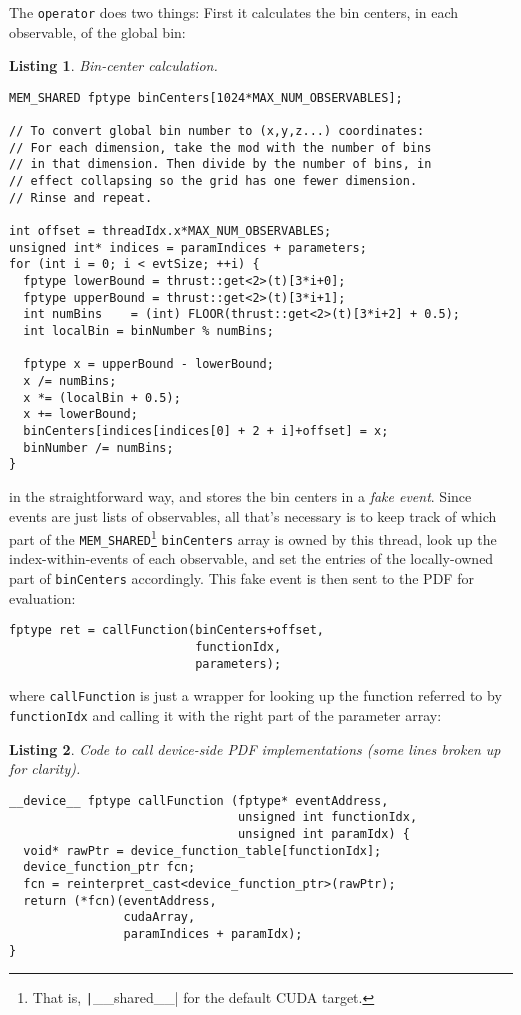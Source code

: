 \documentclass[12pt,pdflatex]{article}
\newtheorem{listing}{Listing}
\begin{document}
The \texttt{operator} does two things: First it calculates the bin centers,
in each observable, of the global bin:
\begin{listing}
\label{listing:bincenter}
Bin-center calculation.

\begin{verbatim}
MEM_SHARED fptype binCenters[1024*MAX_NUM_OBSERVABLES];

// To convert global bin number to (x,y,z...) coordinates: 
// For each dimension, take the mod with the number of bins 
// in that dimension. Then divide by the number of bins, in 
// effect collapsing so the grid has one fewer dimension. 
// Rinse and repeat. 

int offset = threadIdx.x*MAX_NUM_OBSERVABLES;
unsigned int* indices = paramIndices + parameters;
for (int i = 0; i < evtSize; ++i) {
  fptype lowerBound = thrust::get<2>(t)[3*i+0];
  fptype upperBound = thrust::get<2>(t)[3*i+1];
  int numBins    = (int) FLOOR(thrust::get<2>(t)[3*i+2] + 0.5); 
  int localBin = binNumber % numBins;

  fptype x = upperBound - lowerBound; 
  x /= numBins;
  x *= (localBin + 0.5); 
  x += lowerBound;
  binCenters[indices[indices[0] + 2 + i]+offset] = x; 
  binNumber /= numBins;
}
\end{verbatim}
\end{listing}
in the straightforward way, and stores the bin centers in a \emph{fake event}.
Since events are just lists of observables, all that's necessary is to keep track
of which part of the \verb|MEM_SHARED|\footnote{That is, \texttt|\_\_shared\_\_| for the default CUDA target.} 
\texttt{binCenters} array is owned by this
thread, look up the index-within-events of each observable, and set the entries
of the locally-owned part of \texttt{binCenters} accordingly. This fake event is then
sent to the PDF for evaluation:
\begin{verbatim}
fptype ret = callFunction(binCenters+offset, 
                          functionIdx, 
                          parameters); 
\end{verbatim}
where \texttt{callFunction} is just a wrapper for looking up the function referred to
by \texttt{functionIdx} and calling it with the right part of the parameter array:
\begin{listing}
\label{listing:callfunction}
Code to call device-side PDF implementations (some lines
broken up for clarity). 

\begin{verbatim}
__device__ fptype callFunction (fptype* eventAddress, 
                                unsigned int functionIdx, 
                                unsigned int paramIdx) {
  void* rawPtr = device_function_table[functionIdx];
  device_function_ptr fcn;
  fcn = reinterpret_cast<device_function_ptr>(rawPtr);
  return (*fcn)(eventAddress, 
                cudaArray, 
                paramIndices + paramIdx);
}
\end{verbatim}
\end{listing}
\end{document}
